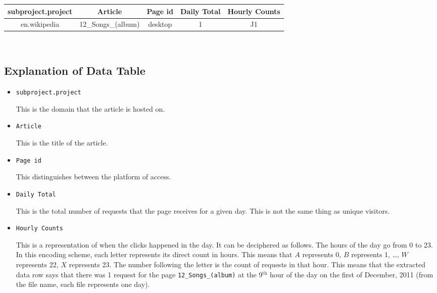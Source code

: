 \documentclass[fontsize=12pt]{article}
\begin{document}
    \begin{center}
    \begin{tabular}{|c|c|c|c|c|}
    \hline
    subproject.project & Article & Page id & Daily Total & Hourly Counts \\
    \hline
    en.wikipedia & 12\_Songs\_(album) & desktop & 1 & J1 \\
    \hline
    \end{tabular}
    \end{center}

    \(\text{ }\)

    \begin{multicols}{2}
    \subsection*{Explanation of Data Table}
    \begin{itemize}
        \item \texttt{subproject.project}

        This is the domain that the article is hosted on.

        \item \texttt{Article}

        This is the title of the article.

        \item \texttt{Page id}

        This distinguishes between the platform of access.

        \item \texttt{Daily Total}

        This is the total number of requests that the page receives for a given day.
        This is not the same thing as unique visitors.

        \item \texttt{Hourly Counts}

        This is a representation of when the clicks happened in the day. It can be deciphered as follows. The hours of the day go from 0 to 23.
        In this encoding scheme, each letter represents its direct count in hours.
        This means that \(A\) represents 0, \(B\) represents 1, \dots, \(W\) represents 22, \(X\) represents 23.
        The number following the letter is the count of requests in that hour.
        This means that the extracted data row says that there was 1 request for the page \texttt{12\_Songs\_(album)} at the 9\(^{\text{th}}\) hour of the day on the first of December, 2011 (from the file name, each file represents one day).
    \end{itemize}


\end{multicols}
\end{document}
